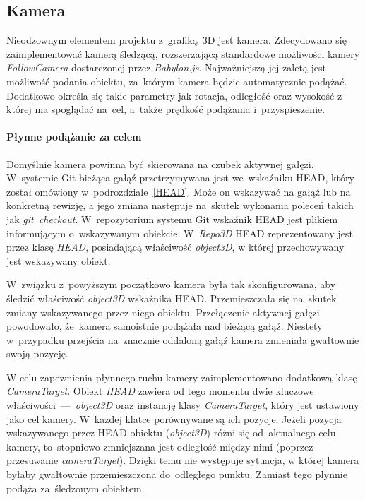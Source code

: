 \documentclass[12pt,a4paper,polish,thesis]{dcsbook}
\begin{document}
{	\subsection{Kamera} \label{camera}

	Nieodzownym elementem projektu z~grafiką~3D jest kamera. Zdecydowano się zaimplementować kamerą śledzącą, rozszerzającą standardowe możliwości kamery \textit{FollowCamera} dostarczonej przez \textit{Babylon.js}. Najważniejszą jej zaletą jest możliwość podania obiektu, za~którym kamera będzie automatycznie podążać. Dodatkowo określa się takie parametry jak rotacja, odległość oraz wysokość z której ma spoglądać na~cel, a~także prędkość podążania i~przyspieszenie.

	\paragraph{Płynne podążanie za celem}

	Domyślnie kamera powinna być skierowana na czubek aktywnej gałęzi. W~systemie Git bieżąca gałąź przetrzymywana jest we~wskaźniku HEAD, który został omówiony w~podrozdziale~\ref{HEAD}. Może on wskazywać na gałąź lub na konkretną rewizję, a jego zmiana następuje na~skutek wykonania poleceń takich jak \textit{git~checkout}. W~repozytorium systemu Git wskaźnik HEAD jest plikiem informującym o~wskazywanym obiekcie. W~\textit{Repo3D} HEAD reprezentowany jest przez klasę \textit{HEAD}, posiadającą właściwość \textit{object3D}, w której przechowywany jest wskazywany obiekt.

	W~związku z~powyższym początkowo kamera była tak skonfigurowana, aby śledzić właściwość \textit{object3D} wskaźnika HEAD. Przemieszczała się na~skutek zmiany wskazywanego przez niego obiektu. Przełączenie aktywnej gałęzi powodowało, że~kamera samoistnie podążała nad bieżącą gałąź. Niestety w~przypadku przejścia na~znacznie oddaloną gałąź kamera zmieniała gwałtownie swoją pozycję.

	W celu zapewnienia płynnego ruchu kamery zaimplementowano dodatkową klasę \textit{CameraTarget}. Obiekt \textit{HEAD} zawiera od tego momentu dwie kluczowe właściwości~---~\textit{object3D} oraz instancję klasy \textit{CameraTarget}, który jest ustawiony jako cel kamery. W~każdej klatce porównywane są ich pozycje. Jeżeli pozycja wskazywanego przez HEAD obiektu (\textit{object3D}) różni się od~aktualnego celu kamery, to~stopniowo zmniejszana jest odległość między nimi (poprzez przesuwanie \textit{cameraTarget}). Dzięki temu nie występuje sytuacja, w której kamera byłaby gwałtownie przemieszczona do~odległego punktu. Zamiast tego płynnie podąża za~śledzonym obiektem.

}
\end{document}
